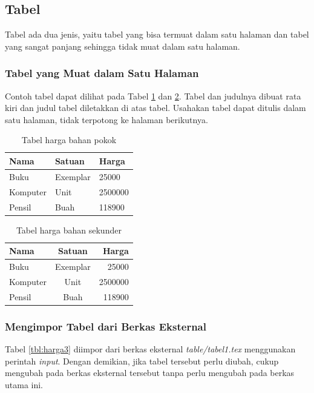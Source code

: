 \subsection{Tabel}
Tabel ada dua jenis, yaitu tabel yang bisa termuat dalam satu halaman dan tabel yang sangat panjang sehingga tidak muat dalam satu halaman.
\subsubsection{Tabel yang Muat dalam Satu Halaman}
Contoh tabel dapat dilihat pada Tabel \ref{tbl:harga1} dan \ref{tbl:harga2}. Tabel dan judulnya dibuat rata kiri dan judul tabel diletakkan di atas tabel. Usahakan tabel dapat ditulis dalam satu halaman, tidak terpotong ke halaman berikutnya.

\begin{table}[t] %
  \begin{tabular}{ | p{2cm} | p{2cm} | p{3cm} |}
	\hline
	Nama 	& Satuan 		& Harga \\
	\hline
	Buku 	& Exemplar	& 25000 \\
	Komputer	& Unit		& 2500000 \\
	Pensil	& Buah		& 118900 \\
	\hline
	\end{tabular}
\caption{Tabel harga bahan pokok}
\label{tbl:harga1}
\end{table}



\begin{table}[t] %
	\begin{tabular}{ | l | c | r | }
	\hline
	Nama 	& Satuan 		& Harga \\
	\hline
	Buku 	& Exemplar	& 25000 \\
	Komputer	& Unit		& 2500000 \\
	Pensil	& Buah		& 118900 \\
	\hline
	\end{tabular}
\caption{Tabel harga bahan sekunder}
\label{tbl:harga2}
\end{table}

\subsubsection{Mengimpor Tabel dari Berkas Eksternal}

Tabel \ref{tbl:harga3} diimpor dari berkas eksternal \textit{table/tabel1.tex} menggunakan perintah \textit{input}. 
Dengan demikian, jika tabel tersebut perlu diubah, cukup mengubah pada berkas eksternal tersebut tanpa perlu mengubah pada berkas utama ini.

